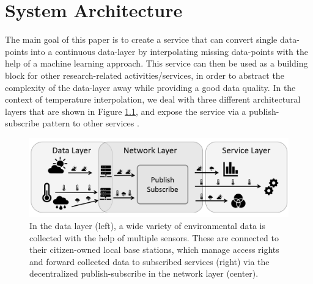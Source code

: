 \chapter{System Architecture}
\label{chap:System Architecture}

The main goal of this paper is to create a service that can convert single data-points into a continuous data-layer by interpolating missing data-points with the help of a machine learning approach. This service can then be used as a building block for other research-related activities/services, in order to abstract the complexity of the data-layer away while providing a good data quality.
In the context of temperature interpolation, we deal with three different architectural layers that are shown in Figure \ref{fig:system-architecture-overview}, and expose the service via a publish-subscribe pattern to other services \cite{bornholdt2019sane}.

\begin{figure}[h]
    \centering
    \includegraphics[width=\textwidth]{images/expose-system-architecture.png}
    \caption{In the data layer (left), a wide variety of environmental data is collected with the help of multiple sensors. These are connected to their citizen-owned local base stations, which manage access rights and forward collected data to subscribed services (right) via the decentralized publish-subscribe in the network layer (center).}
    \label{fig:system-architecture-overview}
\end{figure}

